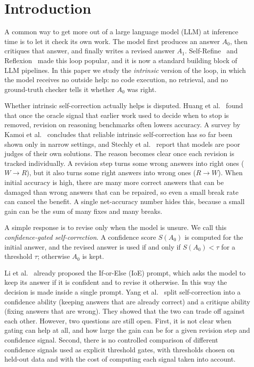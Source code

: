 \section{Introduction}
\label{sec:introduction}

A common way to get more out of a large language model (LLM) at inference time is to let it check its own work. The model first produces an answer $A_0$, then critiques that answer, and finally writes a revised answer $A_1$. Self-Refine~\cite{madaan2023selfrefine} and Reflexion~\cite{shinn2023reflexion} made this loop popular, and it is now a standard building block of LLM pipelines. In this paper we study the \emph{intrinsic} version of the loop, in which the model receives no outside help: no code execution, no retrieval, and no ground-truth checker tells it whether $A_0$ was right.

Whether intrinsic self-correction actually helps is disputed. Huang et al.~\cite{huang2024cannot} found that once the oracle signal that earlier work used to decide when to stop is removed, revision on reasoning benchmarks often lowers accuracy. A survey by Kamoi et al.~\cite{kamoi2024when} concludes that reliable intrinsic self-correction has so far been shown only in narrow settings, and Stechly et al.~\cite{stechly2023gpt4} report that models are poor judges of their own solutions. The reason becomes clear once each revision is tracked individually. A revision step turns some wrong answers into right ones ($W\to R$), but it also turns some right answers into wrong ones ($R\to W$). When initial accuracy is high, there are many more correct answers that can be damaged than wrong answers that can be repaired, so even a small break rate can cancel the benefit. A single net-accuracy number hides this, because a small gain can be the sum of many fixes and many breaks.

A simple response is to revise only when the model is unsure. We call this \emph{confidence-gated self-correction}. A confidence score $S(A_0)$ is computed for the initial answer, and the revised answer is used if and only if $S(A_0)<\tau$ for a threshold $\tau$; otherwise $A_0$ is kept.

Li et al.~\cite{li2024confidence} already proposed the If-or-Else (IoE) prompt, which asks the model to keep its answer if it is confident and to revise it otherwise. In this way the decision is made inside a single prompt. Yang et al.~\cite{yang2024confidence} split self-correction into a confidence ability (keeping answers that are already correct) and a critique ability (fixing answers that are wrong). They showed that the two can trade off against each other. However, two questions are still open. First, it is not clear when gating can help at all, and how large the gain can be for a given revision step and confidence signal. Second, there is no controlled comparison of different confidence signals used as explicit threshold gates, with thresholds chosen on held-out data and with the cost of computing each signal taken into account.

